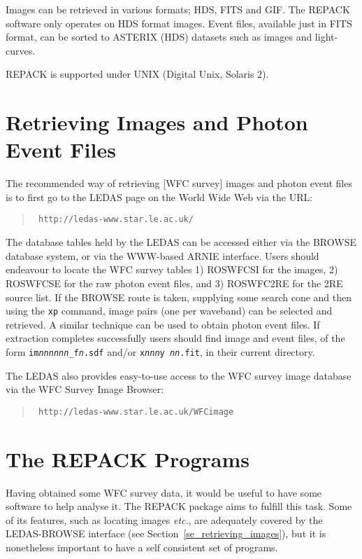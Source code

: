 Images can be retrieved in various formats; HDS, FITS and GIF. The
REPACK software only operates on HDS format images. Event files,
available just in FITS format, can be sorted to ASTERIX (HDS) datasets
such as images and light-curves.

REPACK is supported under UNIX (Digital Unix, Solaris 2).

\section{\label{se_retrieving_images}Retrieving Images and Photon Event Files}

The recommended  way of retrieving [\ro WFC survey] images and photon event 
files is to first go to the LEDAS page on the World Wide Web via the URL:

\begin{quote}{\tt
{}%
{http://ledas-www.star.le.ac.uk/}}
\end{quote}

The database tables held by the LEDAS can be accessed either via the
BROWSE database system, or via the WWW-based ARNIE interface. Users
should endeavour to locate the \ro WFC survey tables 1) ROSWFCSI for
the images, 2) ROSWFCSE for the raw photon event files, and 3)
ROSWFC2RE for the 2RE source list.  If the BROWSE route is taken,
supplying some search cone and then using the {\tt xp} command, image
pairs (one per waveband) can be selected and retrieved.  A similar
technique can be used to obtain photon event files.  If extraction
completes successfully users should find image and event files, of the
form {\tt im{\it nnnnnn}\_f{\it n}.sdf} and/or {\tt x{\it nnn}y{\it
nn}.fit}, in their current directory.

The LEDAS also provides easy-to-use access to the WFC survey image
database via the WFC Survey Image Browser: 

\begin{quote}{\tt
{}%
{http://ledas-www.star.le.ac.uk/WFCimage}}
\end{quote}

\section{\label{se_repack_programs}The REPACK Programs}

Having obtained some \ro WFC survey data, it would be useful to have some
software to help analyse it.  The REPACK package aims to fulfill this
task.  Some of its features, such as locating images \emph{etc.}, are
adequately covered by the LEDAS-BROWSE interface (see
Section~\ref{se_retrieving_images}), but it is nonetheless important to
have a self consistent set of programs.


